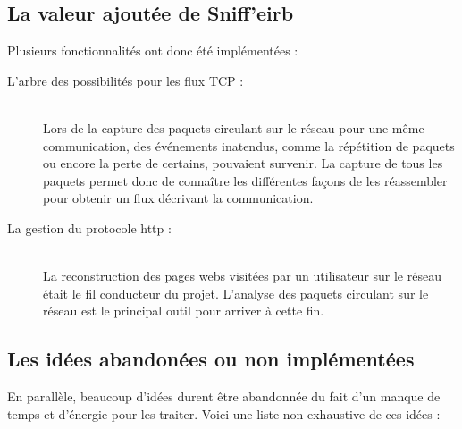 \subsection{La valeur ajoutée de Sniff'eirb}
Plusieurs fonctionnalités ont donc été implémentées :
\begin{description}
\item[L'arbre des possibilités pour les flux TCP :]\\
Lors de la capture des paquets circulant sur le réseau pour une même communication, des événements inatendus, comme la répétition de paquets ou encore la perte de certains,  pouvaient survenir. La capture de tous les paquets permet donc de connaître les différentes façons de les réassembler pour obtenir un flux décrivant la communication. 
\item[La gestion du protocole http :]\\ 
La reconstruction des pages webs visitées par un utilisateur sur le réseau était le fil conducteur du projet. L'analyse des paquets circulant sur le réseau est le principal outil pour arriver à cette fin.
\end{description}

\subsection{Les idées abandonées ou non implémentées}
En parallèle, beaucoup d'idées durent être abandonnée du fait d'un manque de temps et d'énergie pour les traiter. Voici une liste non exhaustive de ces idées :
\begin{description}
\end{description}
